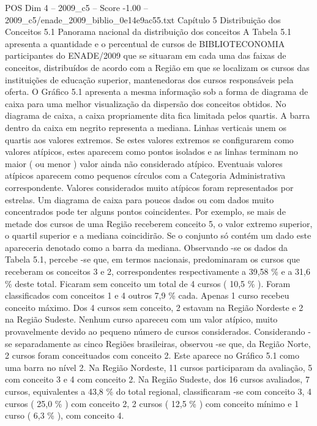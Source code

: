\begin{textsample}{POS Dim 4 – 2009\_c5 – Score -1.00 – 2009\_c5/enade\_2009\_biblio\_0e14e9ac55.txt}  \label{ex:f4_pos_260}
Capítulo 5 Distribuição dos Conceitos 5.1 Panorama nacional da distribuição dos conceitos A Tabela 5.1 apresenta a quantidade e o percentual de cursos de BIBLIOTECONOMIA participantes do ENADE/2009 que se situaram em cada uma das faixas de conceitos, distribuídos de acordo com a Região em que se localizam os cursos das instituições de educação superior, mantenedoras dos cursos responsáveis pela oferta.
O Gráfico 5.1 apresenta a mesma informação sob a forma de diagrama de caixa para uma melhor visualização da dispersão dos conceitos obtidos.
No diagrama de caixa, a caixa propriamente dita fica limitada pelos quartis.
A barra dentro da caixa em negrito representa a mediana.
Linhas verticais unem os quartis aos valores extremos.
Se estes valores extremos se configurarem como valores atípicos, estes aparecem como pontos isolados e as linhas terminam no maior ( ou menor ) valor ainda não considerado atípico.
Eventuais valores atípicos aparecem como pequenos círculos com a Categoria Administrativa correspondente.
Valores considerados muito atípicos foram representados por estrelas.
Um diagrama de caixa para poucos dados ou com dados muito concentrados pode ter alguns pontos coincidentes.
Por exemplo, se mais de metade dos cursos de uma Região receberem conceito 5, o valor extremo superior, o quartil superior e a mediana coincidirão.
Se o conjunto só contém um dado este apareceria denotado como a barra da mediana.
Observando -se os dados da Tabela 5.1, percebe -se que, em termos nacionais, predominaram os cursos que receberam os conceitos 3 e 2, correspondentes respectivamente a 39,58 \% e a 31,6 \% deste total.
Ficaram sem conceito um total de 4 cursos ( 10,5 \% ).
Foram classificados com conceitos 1 e 4 outros 7,9 \% cada.
Apenas 1 curso recebeu conceito máximo.
Dos 4 cursos sem conceito, 2 estavam na Região Nordeste e 2 na Região Sudeste.
Nenhum curso apareceu com um valor atípico, muito provavelmente devido ao pequeno número de cursos considerados.
Considerando -se separadamente as cinco Regiões brasileiras, observou -se que, da Região Norte, 2 cursos foram conceituados com conceito 2.
Este aparece no Gráfico 5.1 como uma barra no nível 2.
Na Região Nordeste, 11 cursos participaram da avaliação, 5 com conceito 3 e 4 com conceito 2.
Na Região Sudeste, dos 16 cursos avaliados, 7 cursos, equivalentes a 43,8 \% do total regional, classificaram -se com conceito 3, 4 cursos ( 25,0 \% ) com conceito 2, 2 cursos ( 12,5 \% ) com conceito mínimo e 1 curso ( 6,3 \% ), com conceito 4.

\end{textsample}
